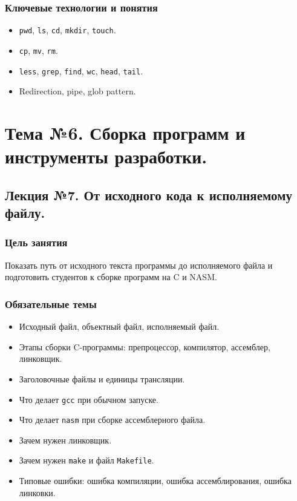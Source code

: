 \subsection*{Ключевые технологии и понятия}
\begin{itemize}
    \item \texttt{pwd}, \texttt{ls}, \texttt{cd}, \texttt{mkdir}, \texttt{touch}.
    \item \texttt{cp}, \texttt{mv}, \texttt{rm}.
    \item \texttt{less}, \texttt{grep}, \texttt{find}, \texttt{wc}, \texttt{head}, \texttt{tail}.
    \item Redirection, pipe, glob pattern.
\end{itemize}

\newpage
\chapter{Тема №6. Сборка программ и инструменты разработки.}
\section{Лекция №7. От исходного кода к исполняемому файлу.}

\subsection*{Цель занятия}
Показать путь от исходного текста программы до исполняемого файла и подготовить студентов к сборке программ на C и NASM.

\subsection*{Обязательные темы}
\begin{itemize}
    \item Исходный файл, объектный файл, исполняемый файл.
    \item Этапы сборки C-программы: препроцессор, компилятор, ассемблер, линковщик.
    \item Заголовочные файлы и единицы трансляции.
    \item Что делает \texttt{gcc} при обычном запуске.
    \item Что делает \texttt{nasm} при сборке ассемблерного файла.
    \item Зачем нужен линковщик.
    \item Зачем нужен \texttt{make} и файл \texttt{Makefile}.
    \item Типовые ошибки: ошибка компиляции, ошибка ассемблирования, ошибка линковки.
\end{itemize}

